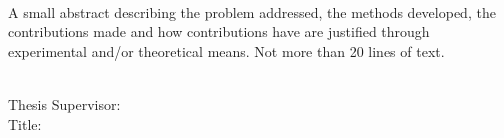 \renewenvironment{abstract}
 {\par\noindent\textbf{\abstractname}\ \ignorespaces}
 {\par\medskip}

\begin{abstract}
    \\ A small abstract describing the problem addressed, the methods developed, the contributions made and how contributions have are justified through experimental and/or theoretical means. 
    Not more than 20 lines of text. \\~\\
    
    \begin{flushleft}
        Thesis Supervisor:  \\
        Title: \\
    \end{flushleft}
\end{abstract}